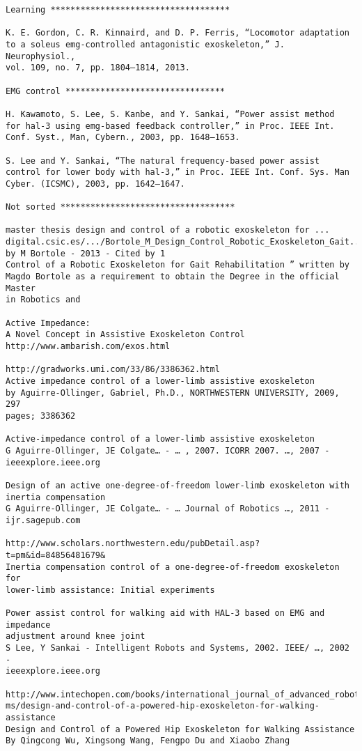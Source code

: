 \documentclass[letterpaper,12pt,fullpage]{article}
\begin{document}
\begin{verbatim}
Learning ************************************

K. E. Gordon, C. R. Kinnaird, and D. P. Ferris, “Locomotor adaptation
to a soleus emg-controlled antagonistic exoskeleton,” J. Neurophysiol.,
vol. 109, no. 7, pp. 1804–1814, 2013.

EMG control ********************************

H. Kawamoto, S. Lee, S. Kanbe, and Y. Sankai, “Power assist method
for hal-3 using emg-based feedback controller,” in Proc. IEEE Int.
Conf. Syst., Man, Cybern., 2003, pp. 1648–1653.

S. Lee and Y. Sankai, “The natural frequency-based power assist
control for lower body with hal-3,” in Proc. IEEE Int. Conf. Sys. Man
Cyber. (ICSMC), 2003, pp. 1642–1647.

Not sorted ***********************************

master thesis design and control of a robotic exoskeleton for ...
digital.csic.es/.../Bortole_M_Design_Control_Robotic_Exoskeleton_Gait...
by M Bortole - ‎2013 - ‎Cited by 1
Control of a Robotic Exoskeleton for Gait Rehabilitation ” written by
Magdo Bortole as a requirement to obtain the Degree in the official Master
in Robotics and

Active Impedance:
A Novel Concept in Assistive Exoskeleton Control
http://www.ambarish.com/exos.html

http://gradworks.umi.com/33/86/3386362.html
Active impedance control of a lower-limb assistive exoskeleton
by Aguirre-Ollinger, Gabriel, Ph.D., NORTHWESTERN UNIVERSITY, 2009, 297
pages; 3386362

Active-impedance control of a lower-limb assistive exoskeleton
G Aguirre-Ollinger, JE Colgate… - … , 2007. ICORR 2007. …, 2007 -
ieeexplore.ieee.org

Design of an active one-degree-of-freedom lower-limb exoskeleton with
inertia compensation
G Aguirre-Ollinger, JE Colgate… - … Journal of Robotics …, 2011 -
ijr.sagepub.com

http://www.scholars.northwestern.edu/pubDetail.asp?t=pm&id=84856481679&
Inertia compensation control of a one-degree-of-freedom exoskeleton for
lower-limb assistance: Initial experiments

Power assist control for walking aid with HAL-3 based on EMG and impedance
adjustment around knee joint
S Lee, Y Sankai - Intelligent Robots and Systems, 2002. IEEE/ …, 2002 -
ieeexplore.ieee.org

http://www.intechopen.com/books/international_journal_of_advanced_robotic_syste\
ms/design-and-control-of-a-powered-hip-exoskeleton-for-walking-assistance
Design and Control of a Powered Hip Exoskeleton for Walking Assistance
By Qingcong Wu, Xingsong Wang, Fengpo Du and Xiaobo Zhang


\end{verbatim}
\end{document}
